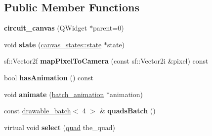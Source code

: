 \subsection*{Public Member Functions}
\begin{DoxyCompactItemize}
\item 
\hypertarget{classophidian_1_1gui_1_1circuit__canvas_a39fe2ee5269db96e4e6d08ac05c21cb2}{{\bfseries circuit\-\_\-canvas} (Q\-Widget $\ast$parent=0)}\label{classophidian_1_1gui_1_1circuit__canvas_a39fe2ee5269db96e4e6d08ac05c21cb2}

\item 
\hypertarget{classophidian_1_1gui_1_1circuit__canvas_a24ebc45078649c293cc8a9115f96855c}{void {\bfseries state} (\hyperlink{classophidian_1_1gui_1_1canvas__states_1_1state}{canvas\-\_\-states\-::state} $\ast$state)}\label{classophidian_1_1gui_1_1circuit__canvas_a24ebc45078649c293cc8a9115f96855c}

\item 
\hypertarget{classophidian_1_1gui_1_1circuit__canvas_ab5ebd163603cbc79214c288eba024e83}{sf\-::\-Vector2f {\bfseries map\-Pixel\-To\-Camera} (const sf\-::\-Vector2i \&pixel) const }\label{classophidian_1_1gui_1_1circuit__canvas_ab5ebd163603cbc79214c288eba024e83}

\item 
\hypertarget{classophidian_1_1gui_1_1circuit__canvas_ab13b3b07aa97aa624d3f7623f666aad9}{bool {\bfseries has\-Animation} () const }\label{classophidian_1_1gui_1_1circuit__canvas_ab13b3b07aa97aa624d3f7623f666aad9}

\item 
\hypertarget{classophidian_1_1gui_1_1circuit__canvas_a597686fe3a38994abab9ec8f2fe18060}{void {\bfseries animate} (\hyperlink{classophidian_1_1gui_1_1batch__animation}{batch\-\_\-animation} $\ast$animation)}\label{classophidian_1_1gui_1_1circuit__canvas_a597686fe3a38994abab9ec8f2fe18060}

\item 
\hypertarget{classophidian_1_1gui_1_1circuit__canvas_a824e1f16ace3adaa2feda9fda2e84d95}{const \hyperlink{classophidian_1_1gui_1_1drawable__batch}{drawable\-\_\-batch}$<$ 4 $>$ \& {\bfseries quads\-Batch} ()}\label{classophidian_1_1gui_1_1circuit__canvas_a824e1f16ace3adaa2feda9fda2e84d95}

\item 
\hypertarget{classophidian_1_1gui_1_1circuit__canvas_a20bbb5f179b7ae08faa1ee273adc2df9}{virtual void {\bfseries select} (\hyperlink{structophidian_1_1gui_1_1quad}{quad} the\-\_\-quad)}\label{classophidian_1_1gui_1_1circuit__canvas_a20bbb5f179b7ae08faa1ee273adc2df9}


\end{DoxyCompactItemize}
